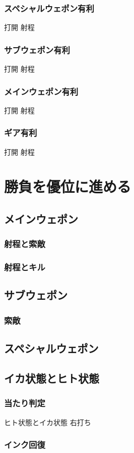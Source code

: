 \documentclass[a4paper,11pt]{jsbook}
\begin{document}
\subsection{スペシャルウェポン有利}
打開
射程
\subsection{サブウェポン有利}
打開
射程
\subsection{メインウェポン有利}
打開
射程
\subsection{ギア有利}
打開
射程

\chapter{勝負を優位に進める}
\section{メインウェポン}
\subsection{射程と索敵}
\subsection{射程とキル}
\section{サブウェポン}
\subsection{索敵}
\section{スペシャルウェポン}
\section{イカ状態とヒト状態}
\subsection{当たり判定}
ヒト状態とイカ状態
右打ち
\subsection{インク回復}
\end{document}
